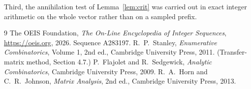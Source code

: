 \documentclass[11pt,a4paper]{article}
\theoremstyle{plain}
\theoremstyle{definition}
\begin{document}
Third, the annihilation test of Lemma~\ref{lem:crit} was carried out in exact integer
arithmetic on the whole vector rather than on a sampled prefix.

\begin{thebibliography}{9}
 The OEIS Foundation, \emph{The On-Line Encyclopedia of Integer
Sequences}, \url{https://oeis.org}, 2026. Sequence A283197.
 R.~P.~Stanley, \emph{Enumerative Combinatorics}, Volume 1, 2nd ed.,
Cambridge University Press, 2011. (Transfer-matrix method, Section 4.7.)
 P.~Flajolet and R.~Sedgewick, \emph{Analytic Combinatorics}, Cambridge
University Press, 2009.
 R.~A.~Horn and C.~R.~Johnson, \emph{Matrix Analysis}, 2nd ed., Cambridge
University Press, 2013.
\end{thebibliography}
\end{document}
